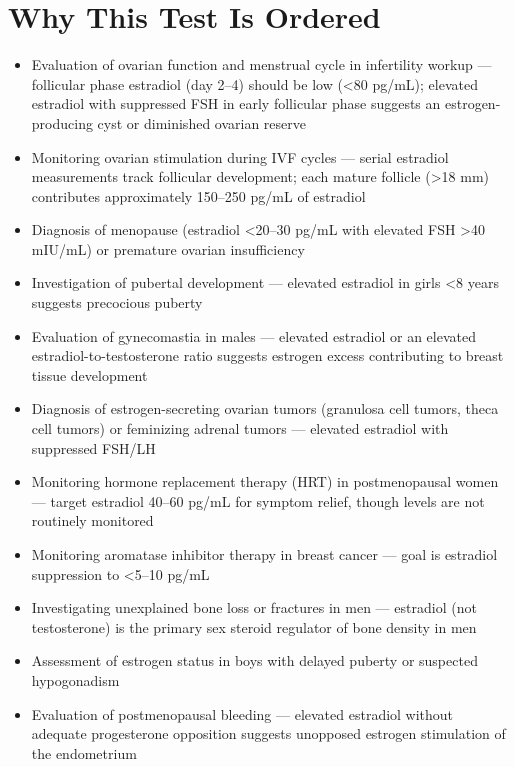 \section*{Why This Test Is Ordered}
\begin{itemize}
  \item Evaluation of ovarian function and menstrual cycle in infertility workup --- follicular phase estradiol (day 2--4) should be low (<80 pg/mL); elevated estradiol with suppressed FSH in early follicular phase suggests an estrogen-producing cyst or diminished ovarian reserve
  \item Monitoring ovarian stimulation during IVF cycles --- serial estradiol measurements track follicular development; each mature follicle (>18 mm) contributes approximately 150--250 pg/mL of estradiol
  \item Diagnosis of menopause (estradiol <20--30 pg/mL with elevated FSH >40 mIU/mL) or premature ovarian insufficiency
  \item Investigation of pubertal development --- elevated estradiol in girls <8 years suggests precocious puberty
  \item Evaluation of gynecomastia in males --- elevated estradiol or an elevated estradiol-to-testosterone ratio suggests estrogen excess contributing to breast tissue development \cite{wierman2014androgen}
  \item Diagnosis of estrogen-secreting ovarian tumors (granulosa cell tumors, theca cell tumors) or feminizing adrenal tumors --- elevated estradiol with suppressed FSH/LH
  \item Monitoring hormone replacement therapy (HRT) in postmenopausal women --- target estradiol 40--60 pg/mL for symptom relief, though levels are not routinely monitored \cite{santen2010postmenopausal}
  \item Monitoring aromatase inhibitor therapy in breast cancer --- goal is estradiol suppression to <5--10 pg/mL
  \item Investigating unexplained bone loss or fractures in men --- estradiol (not testosterone) is the primary sex steroid regulator of bone density in men
  \item Assessment of estrogen status in boys with delayed puberty or suspected hypogonadism
  \item Evaluation of postmenopausal bleeding --- elevated estradiol without adequate progesterone opposition suggests unopposed estrogen stimulation of the endometrium
\end{itemize}

